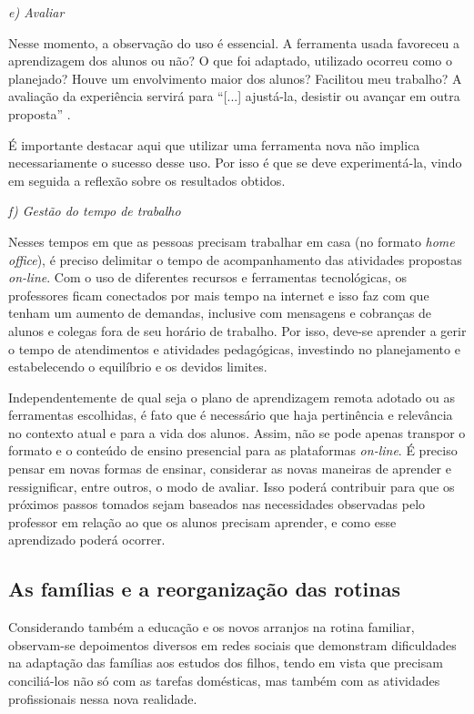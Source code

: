 \documentclass{textolivre}
\begin{document}
\textit{e) Avaliar}

Nesse momento, a observação do uso é essencial. A ferramenta usada favoreceu a aprendizagem dos alunos ou não? O que foi adaptado, utilizado ocorreu como o planejado? Houve um envolvimento maior dos alunos? Facilitou meu trabalho? A avaliação da experiência servirá para “[...] ajustá-la, desistir ou avançar em outra proposta” \cite[p. 111]{ribeiro_escrever_2018}.

É importante destacar aqui que utilizar uma ferramenta nova não implica necessariamente o sucesso desse uso. Por isso é que se deve experimentá-la, vindo em seguida a reflexão sobre os resultados obtidos.  

\textit{f) Gestão do tempo de trabalho}

Nesses tempos em que as pessoas precisam trabalhar em casa (no formato \textit{home office}), é preciso delimitar o tempo de acompanhamento das atividades propostas \textit{on-line}. Com o uso de diferentes recursos e ferramentas tecnológicas, os professores ficam conectados por mais tempo na internet e isso faz com que tenham um aumento de demandas, inclusive com mensagens e cobranças de alunos e colegas fora de seu horário de trabalho. Por isso, deve-se aprender a gerir o tempo de atendimentos e atividades pedagógicas, investindo no planejamento e estabelecendo o equilíbrio e os devidos limites.

Independentemente de qual seja o plano de aprendizagem remota adotado ou as ferramentas escolhidas, é fato que é necessário que haja pertinência e relevância no contexto atual e para a vida dos alunos. Assim, não se pode apenas transpor o formato e o conteúdo de ensino presencial para as plataformas \textit{on-line}. É preciso pensar em novas formas de ensinar, considerar as novas maneiras de aprender e ressignificar, entre outros, o modo de avaliar. Isso poderá contribuir para que os próximos passos tomados sejam baseados nas necessidades observadas pelo professor em relação ao que os alunos precisam aprender, e como esse aprendizado poderá ocorrer. 

\subsection{As famílias e a reorganização das rotinas}\label{sec-familias}
Considerando também a educação e os novos arranjos na rotina familiar, observam-se depoimentos diversos em redes sociais que demonstram dificuldades na adaptação das famílias aos estudos dos filhos, tendo em vista que precisam conciliá-los não só com as tarefas domésticas, mas também com as atividades profissionais nessa nova realidade. 
\end{document}
